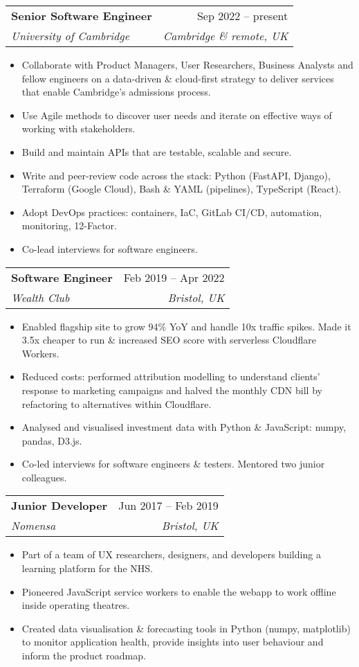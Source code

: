 \documentclass[a4paper,12pt]{article}
\makeatletter
\newcommand{\resumeItem}[1]{
  \item\small{
    {#1 \vspace{-2pt}}
  }
}
\newcommand{\resumeSubheading}[4]{
  \vspace{-2pt}\item
    \begin{tabular*}{0.97\textwidth}[t]{l@{\extracolsep{\fill}}r}
      \textbf{#1} & #2 \\
      \textit{\small#3} & \textit{\small #4} \\
    \end{tabular*}\vspace{-7pt}
}
\newcommand{\resumeItemListStart}{\begin{itemize}}
\newcommand{\resumeItemListEnd}{\end{itemize}\vspace{-5pt}}
\makeatother
\begin{document}
    \resumeSubheading
      {Senior Software Engineer}{Sep 2022 -- present}
      {University of Cambridge}{Cambridge \& remote, UK}
      \vspace{0pt}
    \resumeItemListStart
        \resumeItem{Collaborate with Product Managers, User Researchers, Business Analysts and fellow engineers on a data-driven \& cloud-first strategy to deliver services that enable Cambridge's admissions process.}
        \resumeItem{Use Agile methods to discover user needs and iterate on effective ways of working with stakeholders.}
        \resumeItem{Build and maintain APIs that are testable, scalable and secure.}
        \resumeItem{Write and peer-review code across the stack: Python (FastAPI, Django), Terraform (Google Cloud), Bash \& YAML (pipelines), TypeScript (React).}
        \resumeItem{Adopt DevOps practices: containers, IaC, GitLab CI/CD, automation, monitoring, 12-Factor.}
        \resumeItem{Co-lead interviews for software engineers.}
    \resumeItemListEnd
      \vspace{4pt}

    \resumeSubheading
      {Software Engineer}{Feb 2019 -- Apr 2022}
      {Wealth Club}{Bristol, UK}
      \vspace{0pt}
    \resumeItemListStart
        \resumeItem{Enabled flagship site to grow 94\% YoY and handle 10x traffic spikes. Made it 3.5x cheaper to run \& increased SEO score with serverless Cloudflare Workers.}
        \resumeItem{Reduced costs: performed attribution modelling to understand clients' response to marketing campaigns and halved the monthly CDN bill by refactoring to alternatives within Cloudflare.}
        \resumeItem{Analysed and visualised investment data with Python \& JavaScript: numpy, pandas, D3.js.}
        \resumeItem{Co-led interviews for software engineers \& testers. Mentored two junior colleagues.}
    \resumeItemListEnd
      \vspace{4pt}

    \resumeSubheading
      {Junior Developer}{Jun 2017 -- Feb 2019}
      {Nomensa}{Bristol, UK}
      \vspace{0pt}
    \resumeItemListStart
        \resumeItem{Part of a team of UX researchers, designers, and developers building a learning platform for the NHS.}
        \resumeItem{Pioneered JavaScript service workers to enable the webapp to work offline inside operating theatres.}
        \resumeItem{Created data visualisation \& forecasting tools in Python (numpy, matplotlib) to monitor application health, provide insights into user behaviour and inform the product roadmap.}
    \resumeItemListEnd
\end{document}
